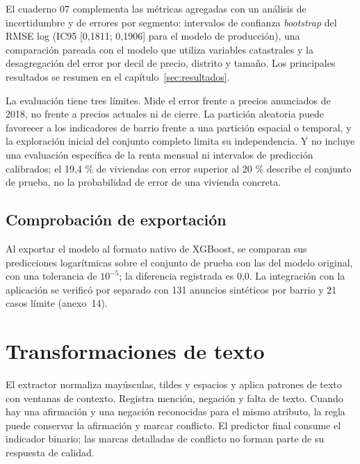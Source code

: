 \documentclass[11pt,a4paper]{article}
\newcounter{anexo}
\newcounter{anexosub}[anexo]
\begin{document}
El cuaderno 07 complementa las métricas agregadas con un análisis de incertidumbre y de errores por segmento: intervalos de confianza \emph{bootstrap} del RMSE log (IC95 [0,1811; 0,1906] para el modelo de producción), una comparación pareada con el modelo que utiliza variables catastrales y la desagregación del error por decil de precio, distrito y tamaño. Los principales resultados se resumen en el capítulo~\ref{sec:resultados}.

La evaluación tiene tres límites. Mide el error frente a precios anunciados de 2018, no frente a precios actuales ni de cierre. La partición aleatoria puede favorecer a los indicadores de barrio frente a una partición espacial o temporal, y la exploración inicial del conjunto completo limita su independencia. Y no incluye una evaluación específica de la renta mensual ni intervalos de predicción calibrados; el 19,4 \% de viviendas con error superior al 20 \% describe el conjunto de prueba, no la probabilidad de error de una vivienda concreta.

%
\subsection*{\theanexo\hspace{0.3em}\hspace{0.45em}Comprobación de exportación}

Al exportar el modelo al formato nativo de XGBoost, se comparan sus predicciones logarítmicas sobre el conjunto de prueba con las del modelo original, con una tolerancia de $10^{-5}$; la diferencia registrada es 0,0. La integración con la aplicación se verificó por separado con 131 anuncios sintéticos por barrio y 21 casos límite (anexo~14).

\clearpage{}\label{anx:\theanexo}%
\section*{\theanexo\hspace{0.6em}Transformaciones de texto}

El extractor normaliza mayúsculas, tildes y espacios y aplica patrones de texto con ventanas de contexto. Registra mención, negación y falta de texto. Cuando hay una afirmación y una negación reconocidas para el mismo atributo, la regla puede conservar la afirmación y marcar conflicto. El predictor final consume el indicador binario; las marcas detalladas de conflicto no forman parte de su respuesta de calidad.
\end{document}
